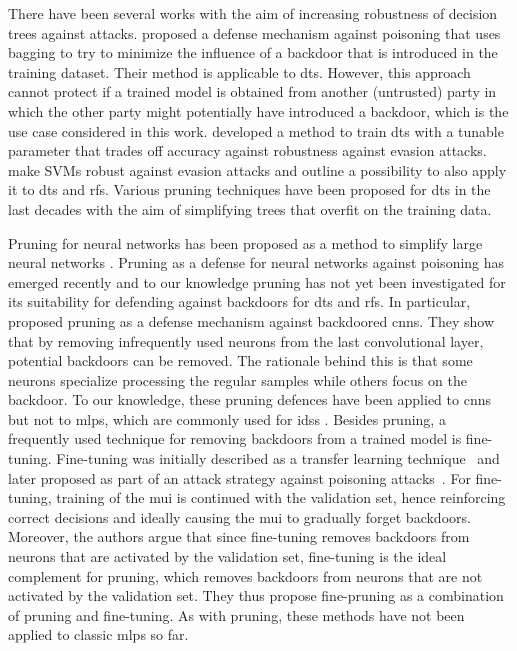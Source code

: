 \documentclass[10pt,sigconf,letterpaper,dvipsnames]{acmart}
\newcommand\note[2]{{\color{#1}#2}}
\newcommand\todo[1]{{\note{red}{TODO: #1}}}
\begin{document}
There have been several works with the aim of increasing robustness of decision trees against attacks. \cite{biggio_bagging_2011} proposed a defense mechanism against poisoning that uses bagging to try to minimize the influence of a backdoor that is introduced in the training dataset. Their method is applicable to \glspl{dt}. However, this approach cannot protect if a trained model is obtained from another (untrusted) party in which the other party might potentially have introduced a backdoor, which is the use case considered in this work. \cite{chen_robust_2019} developed a method to train \glspl{dt} with a tunable parameter that trades off accuracy against robustness against evasion attacks. \cite{russu_secure_2016} make SVMs robust against evasion attacks and outline a possibility to also apply it to \glspl{dt} and \glspl{rf}.
Various pruning techniques have been proposed for \glspl{dt} in the last decades \cite{esposito_comparative_1997} with the aim of simplifying trees that overfit on the training data. 

Pruning for neural networks has been proposed
as a method to simplify large neural networks \cite{sietsma_neural_1988}.
Pruning as a defense for neural networks against poisoning has emerged recently \cite{gu_badnets:_2017} and to our knowledge pruning has not yet been investigated for its suitability for defending against backdoors for \glspl{dt} and \glspl{rf}.
In particular, \cite{gu_badnets:_2017} proposed pruning as a defense mechanism against backdoored \glspl{cnn}. They show that by removing infrequently used neurons from the last convolutional layer, potential backdoors can be removed. The rationale behind this is that some neurons specialize processing the regular samples while others focus on the backdoor. To our knowledge, these pruning defences have been applied to \glspl{cnn} but not to \glspl{mlp}, which are commonly used for \glspl{ids} \cite{meghdouri_analysis_2018}. 
Besides pruning, a frequently used technique for removing backdoors from a trained model is fine-tuning. Fine-tuning was initially described as a transfer learning technique~\cite{yosinski_how_2014} and later proposed as part of an attack strategy against poisoning attacks~\cite{liu_fine-pruning:_2018}. For fine-tuning, training of the \gls{mui} is continued with the validation set, hence reinforcing correct decisions and ideally causing the \gls{mui} to gradually forget backdoors. Moreover, the authors argue that since fine-tuning removes backdoors from neurons that are activated by the validation set, fine-tuning is the ideal complement for pruning, which removes backdoors from neurons that are not activated by the validation set. They thus propose fine-pruning as a combination of pruning and fine-tuning. As with pruning, these methods have not been applied to classic \glspl{mlp} so far.
\end{document}
